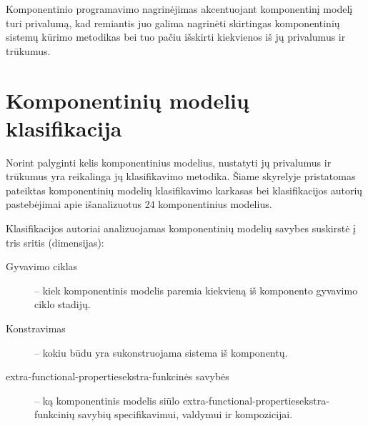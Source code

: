 Komponentinio programavimo nagrinėjimas akcentuojant komponentinį modelį
turi privalumą, kad remiantis juo galima nagrinėti skirtingas
komponentinių sistemų kūrimo metodikas bei tuo pačiu išskirti
kiekvienos iš jų privalumus ir trūkumus.

\section{Komponentinių modelių klasifikacija}

Norint palyginti kelis komponentinius modelius, nustatyti jų privalumus
ir trūkumus yra reikalinga jų klasifikavimo metodika. Šiame skyrelyje
pristatomas \cite{classification-framework-for-scm} pateiktas
komponentinių modelių klasifikavimo karkasas bei klasifikacijos
autorių pastebėjimai apie išanalizuotus 24 komponentinius modelius.

Klasifikacijos autoriai analizuojamas komponentinių modelių savybes
suskirstė į tris sritis (dimensijas):
\begin{description}
  \item[Gyvavimo ciklas] – kiek komponentinis modelis paremia kiekvieną
    iš komponento gyvavimo ciklo stadijų.
  \item[Konstravimas] – kokiu būdu yra sukonstruojama sistema iš
    komponentų.
  \item[\gls{extra-functional-properties}{ekstra-funkcinės savybės}]
    – ką komponentinis modelis siūlo
    \gls{extra-functional-properties}{ekstra-funkcinių savybių}
    specifikavimui, valdymui ir kompozicijai.
\end{description}

